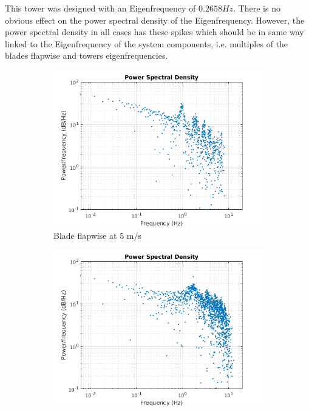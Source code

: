 \documentclass[10pt]{article}
\begin{document}
This tower was designed with an Eigenfrequency of $0.2658 Hz$. There is no obvious effect on the power spectral density of the Eigenfrequency. However, the power spectral density in all cases has these spikes which should be in same way linked to the Eigenfrequency of the system components, i.e. multiples of the blades flapwise and towers eigenfrequencies.

\begin{figure}[H]
  \centering
\begin{subfigure}{0.40\textwidth}
  \includegraphics[width=1\linewidth]{../CIP_6/FAST/PSD_plots/PSD_ws5_wake8_BladeFlap.png}
    \caption{Blade flapwise at 5 m/s}
\end{subfigure}
\begin{subfigure}{0.40\textwidth}
  \includegraphics[width=1\linewidth]{../CIP_6/FAST/PSD_plots/PSD_ws25_wake8_BladeFlap.png}

\end{subfigure}
\end{figure}
\end{document}
